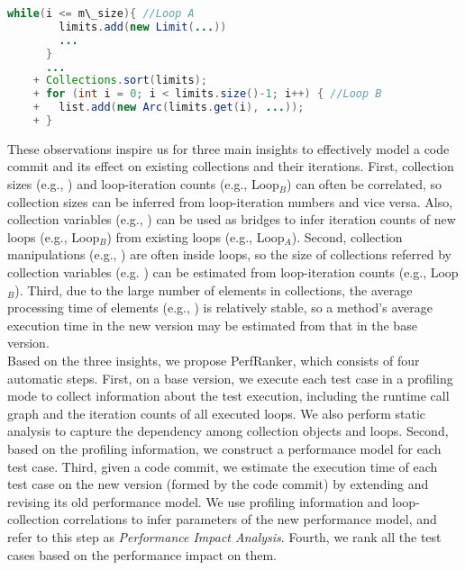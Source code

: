 {\fontsize{10}{10}
	\begin{lstlisting}[columns=flexible,language=Java,caption=Collection Loop Correlation, label={list:example-p3}]
	  while(i <= m\_size){ //Loop A
	    limits.add(new Limit(...))
	    ...
	  }
	  ...
	+ Collections.sort(limits);
	+ for (int i = 0; i < limits.size()-1; i++) { //Loop B
	+   list.add(new Arc(limits.get(i), ...));
	+ }
	\end{lstlisting}
}


These observations inspire us for three main insights to effectively model a code commit and its effect on existing collections and their iterations. First, collection sizes (e.g., ) and loop-iteration counts (e.g., Loop$_B$) can often be correlated, so collection sizes can be inferred from loop-iteration numbers and vice versa. Also, collection variables (e.g., ) can be used as bridges to infer iteration counts of new loops (e.g., Loop$_B$) from existing loops (e.g., Loop$_A$). Second, collection manipulations (e.g., ) are often inside loops, so the size of collections referred by collection variables (e.g. ) can be estimated from loop-iteration counts (e.g., Loop$_B$). Third, due to the large number of elements in collections, the average processing time of elements (e.g., ) is relatively stable, so a method's average execution time in the new version may be estimated from that in the base version.\\ 

Based on the three insights, we propose PerfRanker, which consists of four automatic steps. First, on a base version, we execute each test case in a profiling mode to collect information about the test execution, including the runtime call graph and the iteration counts of all executed loops. We also perform static analysis to capture the dependency among collection objects and loops. Second, based on the profiling information, we construct a performance model for each test case. Third, given a code commit, we estimate the execution time of each test case on the new version (formed by the code commit) by extending and revising its old performance model. We use profiling information and loop-collection correlations to infer parameters of the new performance model, and refer to this step as \textit{Performance Impact Analysis}. Fourth, we rank all the test cases based on the performance impact on them.\\





